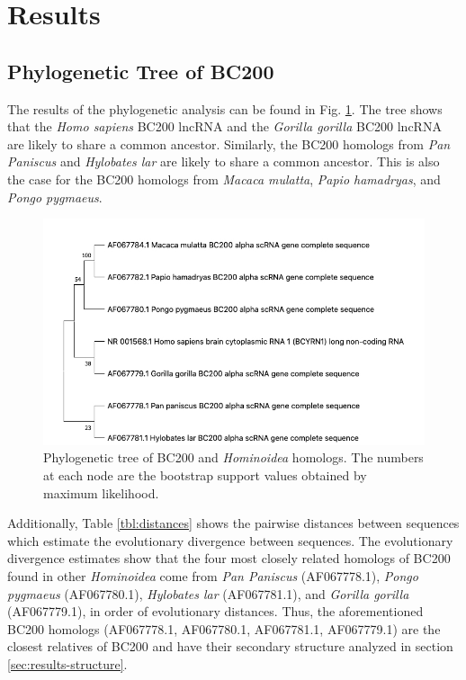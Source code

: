 \documentclass[conference, 11pt]{IEEEtran}
\begin{document}
{\section{Results}\label{sec:results}

\subsection{Phylogenetic Tree of BC200}

The results of the phylogenetic analysis can be found in Fig. \ref{fig:phylo-tree}. 
The tree shows that the \emph{Homo sapiens} BC200 lncRNA and the \emph{Gorilla gorilla} BC200 lncRNA are likely to share a common ancestor. 
Similarly, the BC200 homologs from \emph{Pan Paniscus} and \emph{Hylobates lar} are likely to share a common ancestor. 
This is also the case for the BC200 homologs from \emph{Macaca mulatta}, \emph{Papio hamadryas}, and \emph{Pongo pygmaeus}. 

\begin{figure}[ht]
  \centering
  \includegraphics[width=\columnwidth, keepaspectratio]{figs/phylogenetic-tree.jpg}
  \caption{Phylogenetic tree of BC200 and \emph{Hominoidea} homologs. The numbers at each node are the bootstrap support values obtained by maximum likelihood.}
  \label{fig:phylo-tree}
\end{figure}

Additionally, Table \ref{tbl:distances} shows the pairwise distances between sequences which estimate the evolutionary divergence between sequences. 
The evolutionary divergence estimates show that the four most closely related homologs of BC200 found in other \emph{Hominoidea} come from \emph{Pan Paniscus} (AF067778.1), \emph{Pongo pygmaeus} (AF067780.1), \emph{Hylobates lar} (AF067781.1), and \emph{Gorilla gorilla} (AF067779.1), in order of evolutionary distances. 
Thus, the aforementioned BC200 homologs (AF067778.1, AF067780.1, AF067781.1, AF067779.1) are the closest relatives of BC200 and have their secondary structure analyzed in section \ref{sec:results-structure}.

}
\end{document}
